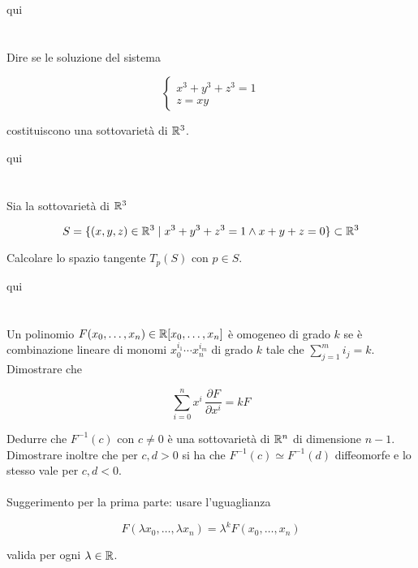qui

\tocless\section{}\label{es2-14}

\begin{tcolorbox}
	Dire se le soluzione del sistema
	
	\begin{equation}
		\begin{cases}
			x^{3} + y^{3} + z^{3} = 1\\
			z = xy
		\end{cases}
	\end{equation}

	costituiscono una sottovarietà di $ \mathbb{R}^{3} $.
\end{tcolorbox}

qui

\tocless\section{}\label{BONUS2-3}

\begin{tcolorbox}
	Sia la sottovarietà di $ \mathbb{R}^{3} $
	
	\begin{equation}
		S = \{ (x,y,z) \in \mathbb{R}^{3} \mid x^{3} + y^{3} + z^{3} = 1 \wedge x+y+z=0 \} \subset \mathbb{R}^{3}
	\end{equation}
	
	Calcolare lo spazio tangente $ T_{p}(S) $ con $ p \in S $.
\end{tcolorbox}

qui

\tocless\section{}\label{es2-15}

\begin{tcolorbox}
	Un polinomio $ F(x_{0},\dots,x_{n}) \in \mathbb{R}[x_{0},\dots,x_{n}] $ è omogeneo di grado $ k $ se è combinazione lineare di monomi $ x_{0}^{i_{1}} \cdots x_{n}^{i_{m}} $ di grado $ k $ tale che $ \sum_{j=1}^{m} i_{j} = k $. Dimostrare che
	
	\begin{equation}
		\sum_{i=0}^{n} x^{i} \, \dfrac{\partial F}{\partial x^{i}} = k F
	\end{equation}

	Dedurre che $ F^{-1}(c) $ con $ c \neq 0 $ è una sottovarietà di $ \mathbb{R}^{n} $ di dimensione $ n-1 $. Dimostrare inoltre che per $ c,d>0 $ si ha che $ F^{-1}(c) \simeq F^{-1}(d) $ diffeomorfe e lo stesso vale per $ c,d<0 $.\\\\
	Suggerimento per la prima parte: usare l'uguaglianza
	
	\begin{equation}
		F(\lambda x_{0},\dots,\lambda x_{n}) = \lambda^{k} F(x_{0},\dots,x_{n})
	\end{equation}
	
	valida per ogni $ \lambda \in \mathbb{R} $.
\end{tcolorbox}

